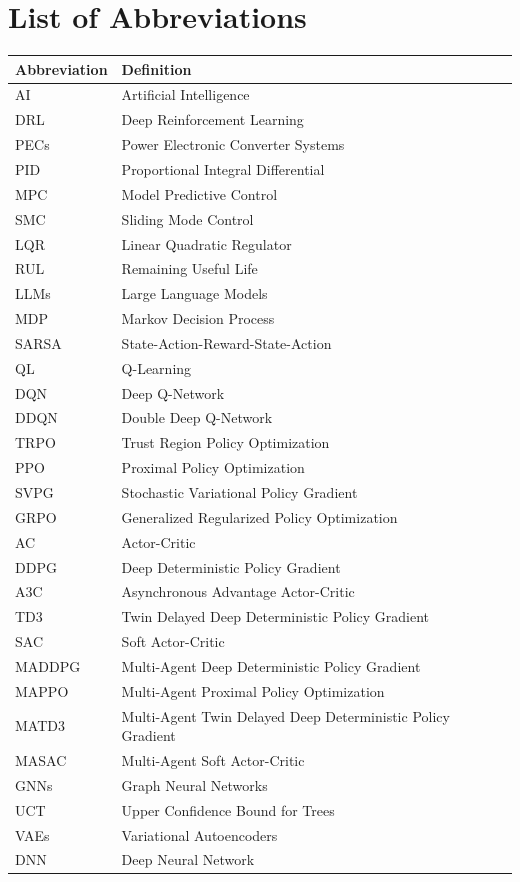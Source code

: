 \section*{List of Abbreviations}
\begin{table}[h]
\renewcommand{\arraystretch}{1.2}
\centering
\begin{tabular}{ll}
\hline
\textbf{Abbreviation} & \textbf{Definition} \\
\hline
AI   & Artificial Intelligence \\
DRL  & Deep Reinforcement Learning \\
PECs & Power Electronic Converter Systems \\
PID  & Proportional Integral Differential \\
MPC  & Model Predictive Control \\
SMC & Sliding Mode Control \\
LQR & Linear Quadratic Regulator \\
RUL  & Remaining Useful Life \\
LLMs & Large Language Models \\
MDP  & Markov Decision Process \\
SARSA & State-Action-Reward-State-Action \\
QL   & Q-Learning \\
DQN  & Deep Q-Network \\
DDQN & Double Deep Q-Network \\
TRPO & Trust Region Policy Optimization \\
PPO  & Proximal Policy Optimization \\
SVPG & Stochastic Variational Policy Gradient \\
GRPO & Generalized Regularized Policy Optimization \\
AC & Actor-Critic\\
DDPG & Deep Deterministic Policy Gradient \\
A3C  & Asynchronous Advantage Actor-Critic \\
TD3  & Twin Delayed Deep Deterministic Policy Gradient \\
SAC  & Soft Actor-Critic \\
MADDPG & Multi-Agent Deep Deterministic Policy Gradient \\
MAPPO & Multi-Agent Proximal Policy Optimization \\
MATD3 & Multi-Agent Twin Delayed Deep Deterministic Policy Gradient \\
MASAC & Multi-Agent Soft Actor-Critic \\
GNNs  & Graph Neural Networks \\
UCT  & Upper Confidence Bound for Trees \\
VAEs & Variational Autoencoders \\
DNN  & Deep Neural Network \\                      



\end{tabular}
\end{table}
